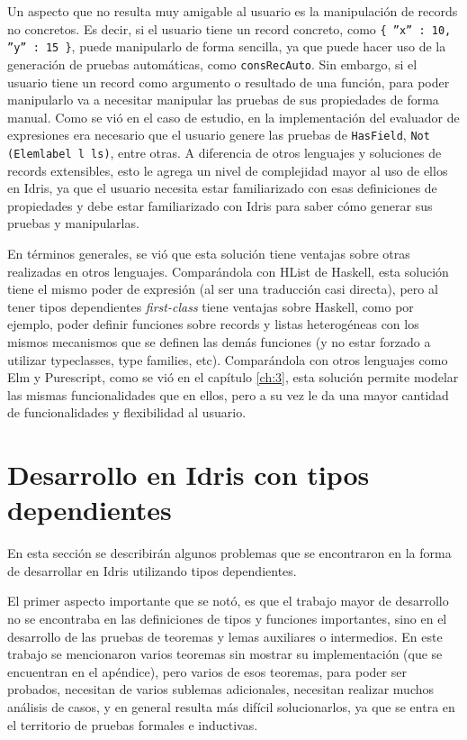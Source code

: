 Un aspecto que no resulta muy amigable al usuario es la manipulación de records no concretos. Es decir, si el usuario tiene un record concreto, como \texttt{\{ ''x'' : 10, ''y'' : 15 \}}, puede manipularlo de forma sencilla, ya que puede hacer uso de la generación de pruebas automáticas, como \texttt{consRecAuto}. Sin embargo, si el usuario tiene un record como argumento o resultado de una función, para poder manipularlo va a necesitar manipular las pruebas de sus propiedades de forma manual. Como se vió en el caso de estudio, en la implementación del evaluador de expresiones era necesario que el usuario genere las pruebas de \texttt{HasField}, \texttt{Not (Elemlabel l ls)}, entre otras. A diferencia de otros lenguajes y soluciones de records extensibles, esto le agrega un nivel de complejidad mayor al uso de ellos en Idris, ya que el usuario necesita estar familiarizado con esas definiciones de propiedades y debe estar familiarizado con Idris para saber cómo generar sus pruebas y manipularlas.

En términos generales, se vió que esta solución tiene ventajas sobre otras realizadas en otros lenguajes. Comparándola con HList de Haskell, esta solución tiene el mismo poder de expresión (al ser una traducción casi directa), pero al tener tipos dependientes \textit{first-class} tiene ventajas sobre Haskell, como por ejemplo, poder definir funciones sobre records y listas heterogéneas con los mismos mecanismos que se definen las demás funciones (y no estar forzado a utilizar typeclasses, type families, etc). Comparándola con otros lenguajes como Elm y Purescript, como se vió en el capítulo \ref{ch:3}, esta solución permite modelar las mismas funcionalidades que en ellos, pero a su vez le da una mayor cantidad de funcionalidades y flexibilidad al usuario.

\section{Desarrollo en Idris con tipos dependientes}

En esta sección se describirán algunos problemas que se encontraron en la forma de desarrollar en Idris utilizando tipos dependientes.

El primer aspecto importante que se notó, es que el trabajo mayor de desarrollo no se encontraba en las definiciones de tipos y funciones importantes, sino en el desarrollo de las pruebas de teoremas y lemas auxiliares o intermedios. En este trabajo se mencionaron varios teoremas sin mostrar su implementación (que se encuentran en el apéndice), pero varios de esos teoremas, para poder ser probados, necesitan de varios sublemas adicionales, necesitan realizar muchos análisis de casos, y en general resulta más difícil solucionarlos, ya que se entra en el territorio de pruebas formales e inductivas.

